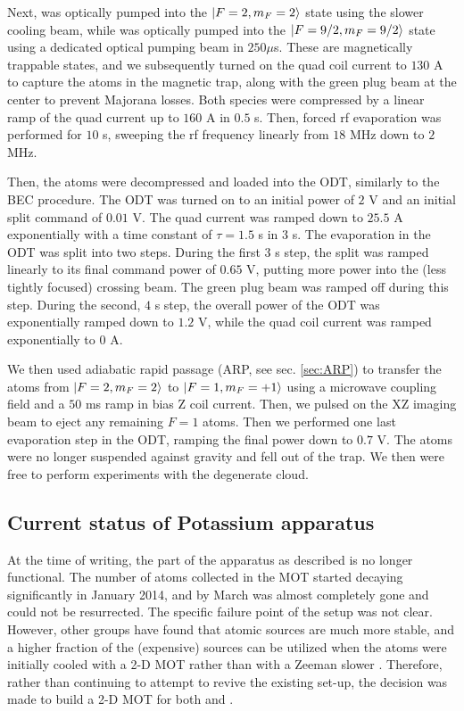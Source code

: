 Next, \Rb{} was optically pumped into the $\mathinner{|{F=2, m_F=2}\rangle}$ state using the slower cooling beam, while \K{} was optically pumped into the $\mathinner{|{F=9/2,m_F=9/2}\rangle}$ state using a dedicated optical pumping beam in $250 \mu$s. These are magnetically trappable states, and we subsequently turned on the quad coil current to $130$ A to capture the atoms in the magnetic trap, along with the green plug beam at the center to prevent Majorana losses. Both species were compressed by a linear ramp of the quad current up to $160$ A in $0.5$ s. Then, forced rf evaporation was performed for $10$ s, sweeping the rf frequency linearly from $18$ MHz down to $2$ MHz.

Then, the atoms were decompressed and loaded into the ODT, similarly to the BEC procedure. The ODT was turned on to an initial power of $2$ V and an initial split command of $0.01$ V. The quad current was ramped down to $25.5$ A exponentially with a time constant of $\tau=1.5$ s in $3$ s. The evaporation in the ODT was split into two steps. During the first $3$ s step, the split was ramped linearly to its final command power of $0.65$ V, putting more power into the (less tightly focused) crossing beam. The green plug beam was ramped off during this step. During the second, $4$ s step, the overall power of the ODT was exponentially ramped down to $1.2$ V, while the quad coil current was ramped exponentially to $0$ A.


We then used adiabatic rapid passage (ARP, see sec. \ref{sec:ARP}) to transfer the \Rb{} atoms from $\mathinner{|{F = 2,m_F = 2}\rangle}$ to $\mathinner{|{F = 1,m_F = +1}\rangle}$ using a microwave coupling field and a $50$ ms ramp in bias Z coil current. Then, we pulsed on the XZ imaging beam to eject any remaining $F=1$ atoms. Then we performed one last evaporation step in the ODT, ramping the final power down to $0.7$ V. The \Rb{} atoms were no longer suspended against gravity and fell out of the trap. We then were free to perform experiments with the degenerate \K{} cloud. 

\subsection{Current status of Potassium apparatus}

At the time of writing, the \K{} part of the apparatus as described is no longer functional. The number of \K{} atoms collected in the MOT started decaying significantly in January 2014, and by March was almost completely gone and could not be resurrected. The specific failure point of the setup was not clear. However, other groups have found that atomic sources are much more stable, and a higher fraction of the (expensive) \K{} sources can be utilized when the atoms were initially cooled with a 2-D MOT rather than with a Zeeman slower \cite{Catani2006,UehlingerThesis,Pedrozo2016}. Therefore, rather than continuing to attempt to revive the existing set-up, the decision was made to build a 2-D MOT for both \K{} and \Rb{}.

